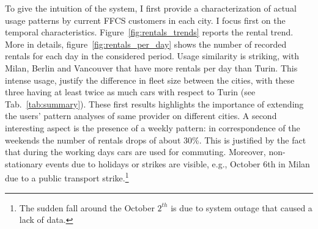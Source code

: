 To give the intuition of the system, I first provide a characterization of actual usage patterns by current FFCS customers in each city. I focus first on the temporal characteristics.
Figure~\ref{fig:rentals_trends} reports the rental trend. More in details, figure~\ref{fig:rentals_per_day} shows the number of recorded rentals for each day in the considered period. Usage similarity is striking, with Milan, Berlin and Vancouver that have more rentals per day than Turin. This intense usage, justify the difference in fleet size between the cities, with these three having at least twice as much cars with respect to Turin (see Tab.~\ref{tab:summary}). These first results highlights the importance of extending the users' pattern analyses of same provider on different cities. A second interesting aspect is the presence of a weekly pattern: in correspondence of the weekends the number of rentals drops of about 30\%. This is justified by the fact that during the working days cars are used for commuting. Moreover, non-stationary events due to holidays or strikes are visible, e.g., October 6th in Milan due to a public transport strike.\footnote{The sudden fall around the October $2^{th}$ is due to system outage that caused a lack of data.} 

